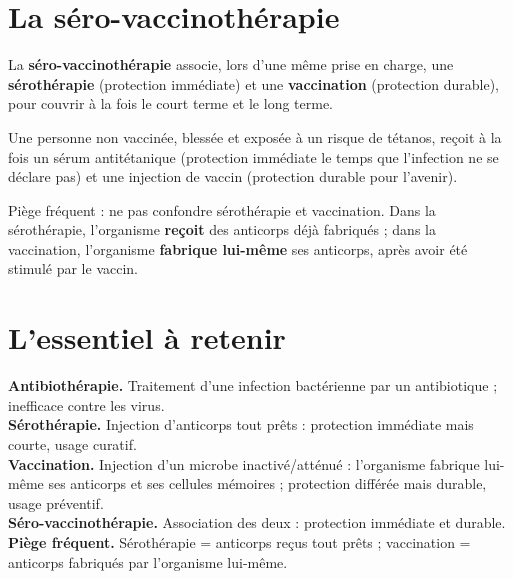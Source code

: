 \section{La séro-vaccinothérapie}

\begin{definition}
La \textbf{séro-vaccinothérapie} associe, lors d'une même prise en charge, une
\textbf{sérothérapie} (protection immédiate) et une \textbf{vaccination} (protection
durable), pour couvrir à la fois le court terme et le long terme.
\end{definition}

\begin{exemple}
Une personne non vaccinée, blessée et exposée à un risque de tétanos, reçoit à la fois
un sérum antitétanique (protection immédiate le temps que l'infection ne se
déclare pas) et une injection de vaccin (protection durable pour l'avenir).
\end{exemple}

\begin{remarque}
Piège fréquent : ne pas confondre sérothérapie et vaccination. Dans la sérothérapie,
l'organisme \textbf{reçoit} des anticorps déjà fabriqués ; dans la vaccination,
l'organisme \textbf{fabrique lui-même} ses anticorps, après avoir été stimulé par le
vaccin.
\end{remarque}

\section{L'essentiel à retenir}

\begin{synthese}
\textbf{Antibiothérapie.} Traitement d'une infection bactérienne par un antibiotique ;
inefficace contre les virus.\\[4pt]
\textbf{Sérothérapie.} Injection d'anticorps tout prêts : protection immédiate mais
courte, usage curatif.\\[4pt]
\textbf{Vaccination.} Injection d'un microbe inactivé/atténué : l'organisme fabrique
lui-même ses anticorps et ses cellules mémoires ; protection différée mais durable,
usage préventif.\\[4pt]
\textbf{Séro-vaccinothérapie.} Association des deux : protection immédiate et
durable.\\[4pt]
\textbf{Piège fréquent.} Sérothérapie = anticorps reçus tout prêts ; vaccination =
anticorps fabriqués par l'organisme lui-même.
\end{synthese}

